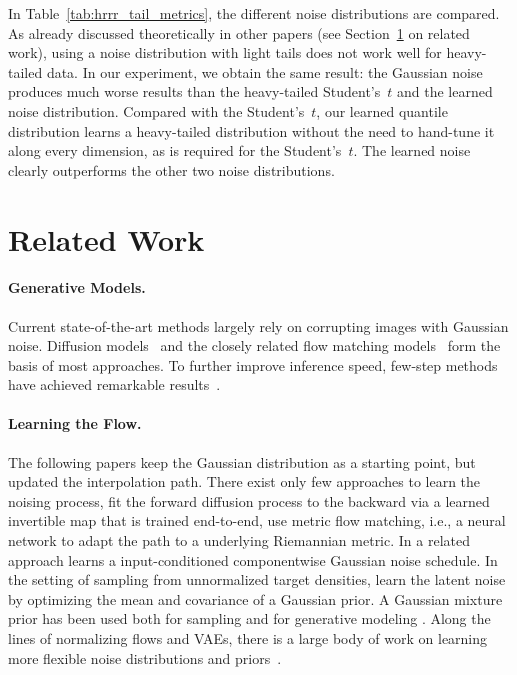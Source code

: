 \documentclass{article}
\theoremstyle{plain}
\theoremstyle{definition}
\theoremstyle{remark}
\begin{document}
In Table~\ref{tab:hrrr_tail_metrics}, the different noise distributions are compared. As already discussed theoretically in other papers (see Section~\ref{sec:related work} on related work), using a noise distribution with light tails does not work well for heavy-tailed data. In our experiment, we obtain the same result: the Gaussian noise produces much worse results than the heavy-tailed Student's~$t$ and the learned noise distribution. Compared with the Student's~$t$, our learned quantile distribution learns a heavy-tailed distribution without the need to hand-tune it along every dimension, as is required for the Student's~$t$. The learned noise clearly outperforms the other two noise distributions.
\section{Related Work} \label{sec:related work}

\paragraph{Generative Models.}
Current state-of-the-art methods largely rely on corrupting images with Gaussian noise. Diffusion models~\cite{song2021scorebasedgenerativemodelingstochastic, ho2020denoisingdiffusionprobabilisticmodels, song2022denoisingdiffusionimplicitmodels} and the closely related flow matching models~\cite{liu2023flow, lipman2023flow, albergo2023stochastic} form the basis of most approaches. To further improve inference speed, few-step methods have achieved remarkable results~\cite{consistency_song, geng2025meanflowsonestepgenerative, IMM2025}.

\paragraph{Learning the Flow.}
The following papers keep the Gaussian distribution as a starting point, but updated the interpolation path.
There exist only few approaches to learn the noising process, \cite{bartosh2025neuralflowdiffusionmodels} fit the forward diffusion process to the backward via a learned invertible map that is trained end-to-end, \cite{kapusniak2024metric} use metric flow matching, i.e., a neural network to adapt the path to a underlying Riemannian metric. In a related approach \cite{sahoo2024mulan} learns a input-conditioned componentwise Gaussian noise schedule. In the setting of sampling from unnormalized target densities, \cite{Blessing2025UDB} learn the latent noise by optimizing the mean and covariance of a Gaussian prior. A Gaussian mixture prior has been used both for sampling \cite{blessing2025endtoendlearninggaussianmixture} and for generative modeling \cite{issachar2025designingconditionalpriordistribution}. \newline
Along the lines of normalizing flows and VAEs, there is a large body of work on learning more flexible noise distributions and priors~\cite{stimper2022resamplingbasedistributionsnormalizing, bauer2019resampledpriorsvariationalautoencoders, hickling2025flexible, amiri2024practical}.
\end{document}
